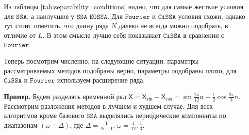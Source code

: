 \documentclass[12pt, specialist, subf
]{disser}
\theoremstyle{definition}
\newcommand{\SSA}{\texttt{SSA}}
\newcommand{\EOSSA}{\texttt{SSA EOSSA}}
\newcommand{\CISSA}{\texttt{CiSSA}}
\newcommand{\FOURIER}{\texttt{Fourier}}
\newcommand{\TS}{\mathsf{X}}
\begin{document}
Из таблицы \ref{tab:separability_conditions} видно, что для самые жесткие условия для $\SSA$, а наилучшие у $\EOSSA$.  Для $\FOURIER$ и $\CISSA$ условия схожи, однако тут стоит отметить, что длину ряда $N$ далеко не всегда можно подобрать, в отличие от $L$. В этом смысле лучше себя показывает $\CISSA$ в сравнении с $\FOURIER$.

Теперь посмотрим численно, на следующие ситуации: параметры рассматриваемых методов подобраны верно, параметры подобраны плохо, для $\CISSA$ и $\FOURIER$ используем расширение ряда.





\textbf{\large{Пример.}} Будем разделять временной ряд $\TS = \TS_{\sin} + \TS_{\cos} = \sin{\frac{2\pi}{12}n} + \frac{1}{2}\cos{\frac{2\pi}{3}n}$. Рассмотрим разложения методов в лучшем и худшем случае. Для всех алгоритмов кроме базового $\SSA$ выделялись периодические компоненты по диапазонам $\left(\omega \pm \Delta \right)$, где $\Delta = \frac{1}{N+1}$, $\omega = \frac{1}{12}, \frac{1}{3}$.
\end{document}

